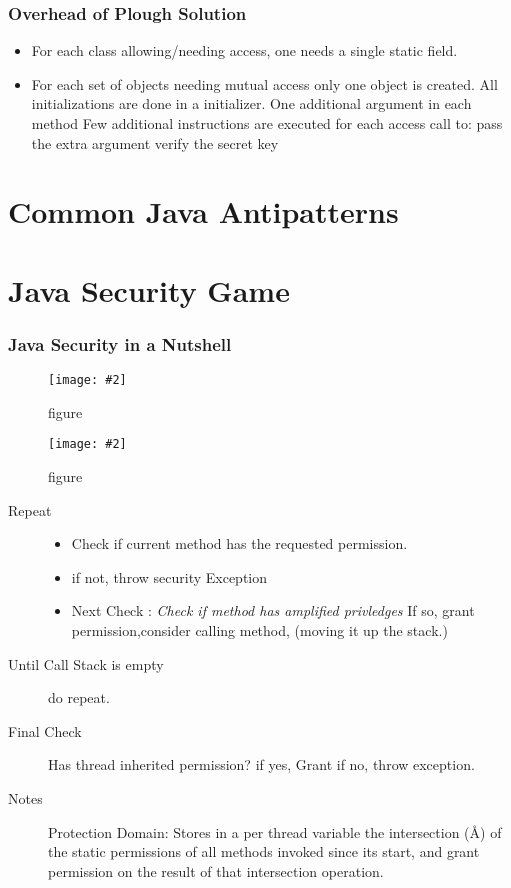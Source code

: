 \documentclass[a4paper,10pt]{scrreprt}
\newcommand{\pic}[2][figure]{\begin{figure}[h]
 \centering
 \texttt{[image: \#2]}
 \caption{#1}
\end{figure}
}
\begin{document}
\subsection{Overhead of Plough Solution}
\begin{itemize}
\item For each class allowing/needing access, one needs a single static field.
\item For each set of objects needing mutual access only one object is created.
\subitem All initializations are done in a
initializer.
\subitem  One additional argument in each
method
\subitem  Few additional instructions are executed for each access call to:
\subsubitem pass the extra argument
\subsubitem verify the secret key
\end{itemize}


\chapter{Common Java Antipatterns}
 
 
\chapter{Java Security Game}
\subsection{Java Security in a Nutshell}
\pic{jsn1.png}
\pic{jsn2.png}
\begin{description}
 \item [Repeat] \begin{itemize}
                 \item Check if current method has the requested permission.
                 \item if not, throw security Exception
                 \item Next Check : \textit{Check if method has amplified privledges} If so, grant permission,consider 
calling method, (moving it up the stack.)
                \end{itemize}
\item[Until Call Stack is empty] do repeat.
\item[Final Check] Has thread inherited permission? if yes, Grant if no, throw exception.
\item [Notes] Protection Domain: Stores in a per thread variable the intersection (Å) of the static
permissions of all methods invoked since its start, and grant permission on the result of
that intersection operation.

\end{description}
\end{document}
